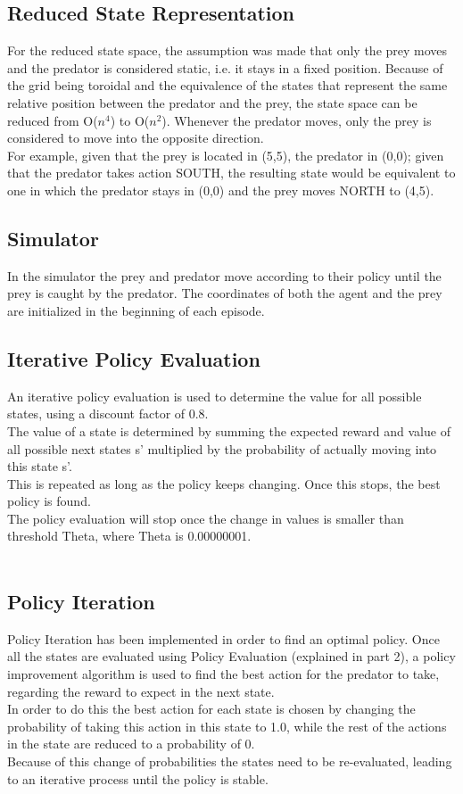\documentclass[11pt]{article}
\begin{document}
\subsection{Reduced State Representation}
For the reduced state space, the assumption was made that only the prey moves and the predator is considered static, i.e. it stays in a fixed position. Because of the grid being toroidal and the equivalence of the states that represent the same relative position between the predator and the prey, the state space can be reduced from O($n^4$) to O($n^2$). Whenever the predator moves, only the prey is considered to move into the opposite direction.\\
For example, given that the prey is located in (5,5), the predator in (0,0); given that the predator takes action SOUTH, the resulting state would be equivalent to one in which the predator stays in (0,0) and the prey moves NORTH to (4,5).



\subsection{Simulator}
In the simulator the prey and predator move according to their policy until the prey is caught by the predator. The coordinates of both the agent and the prey are initialized in the beginning of each episode.


\subsection{Iterative Policy Evaluation}
An iterative policy evaluation is used to determine the value for all possible states, using a discount factor of 0.8.\\
The value of a state is determined by summing the expected reward and value of all possible next states s' multiplied by the probability of actually moving into this state s'.\\
This is repeated as long as the policy keeps changing. Once this stops, the best policy is found.\\
The policy evaluation will stop once the change in values is smaller than threshold Theta, where Theta is 0.00000001.\\\\


\subsection{Policy Iteration}
Policy Iteration has been implemented in order to find an optimal policy.
Once all the states are evaluated using Policy Evaluation (explained in part 2), a policy improvement algorithm is used to find the best action for the predator to take, regarding the reward to expect in the next state.\\
In order to do this the best action for each state is chosen by changing the probability of taking this action in this state to 1.0, while the rest of the actions in the state are reduced to a probability of 0. \\
Because of this change of probabilities the states need to be re-evaluated, leading to an iterative process until the policy is stable.
\end{document}
